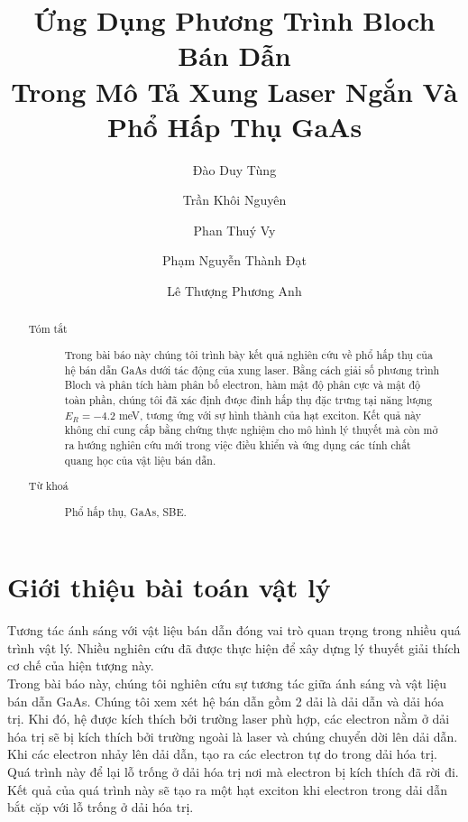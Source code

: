 \documentclass[%
reprint,
amsmath,amssymb,
superscriptaddress,
aps,
]{revtex4-2}
\begin{document}

\title{Ứng Dụng Phương Trình Bloch Bán Dẫn\\ Trong Mô Tả Xung Laser Ngắn Và Phổ Hấp Thụ GaAs}%

\author{Đào Duy Tùng}
\author{Trần Khôi Nguyên}
\author{Phan Thuý Vy}
\author{Phạm Nguyễn Thành Đạt}
\author{Lê Thượng Phương Anh}

\begin{abstract}
	\begin{description}
		\item [Tóm tắt] Trong bài báo này chúng tôi trình bày kết quả nghiên cứu về phổ hấp thụ của hệ bán dẫn GaAs dưới tác động của xung laser. Bằng cách giải số phương trình Bloch và phân tích hàm phân bố electron, hàm mật độ phân cực và mật độ toàn phần, chúng tôi đã xác định được đỉnh hấp thụ đặc trưng tại năng lượng $E_{R}=-4.2$ meV, tương ứng với sự hình thành của hạt exciton. Kết quả này không chỉ cung cấp bằng chứng thực nghiệm cho mô hình lý thuyết mà còn mở ra hướng nghiên cứu mới trong việc điều khiển và ứng dụng các tính chất quang học của vật liệu bán dẫn.
		\item[Từ khoá]
		Phổ hấp thụ, GaAs, SBE.
	\end{description}
\end{abstract}
\maketitle
\section{\label{sec:level1}Giới thiệu bài toán vật lý}
Tương tác ánh sáng với vật liệu bán dẫn đóng vai trò quan trọng trong nhiều quá trình vật lý. Nhiều nghiên cứu đã được thực hiện để xây dựng lý thuyết giải thích cơ chế của hiện tượng này.\\
Trong bài báo này, chúng tôi nghiên cứu sự tương tác giữa ánh sáng và vật liệu bán dẫn GaAs. Chúng tôi xem xét hệ bán dẫn gồm 2 dải là dải dẫn và dải hóa trị. Khi đó, hệ được kích thích bởi trường laser phù hợp, các electron nằm ở dải hóa trị sẽ bị kích thích bởi trường ngoài là laser và chúng chuyển dời lên dải dẫn.\\
Khi các electron nhảy lên dải dẫn, tạo ra các electron tự do trong dải hóa trị. Quá trình này để lại lỗ trống ở dải hóa trị nơi mà electron bị kích thích đã rời đi. Kết quả của quá trình này sẽ tạo ra một hạt exciton khi electron trong dải dẫn bắt cặp với lỗ trống ở dải hóa trị.
\end{document}
